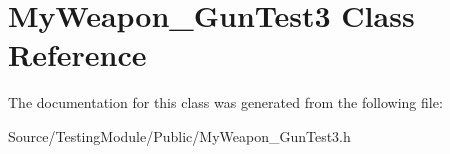 \hypertarget{class_my_weapon___gun_test3}{}\section{My\+Weapon\+\_\+\+Gun\+Test3 Class Reference}
\label{class_my_weapon___gun_test3}


The documentation for this class was generated from the following file\+:\begin{DoxyCompactItemize}
\item 
Source/\+Testing\+Module/\+Public/My\+Weapon\+\_\+\+Gun\+Test3.\+h\end{DoxyCompactItemize}
